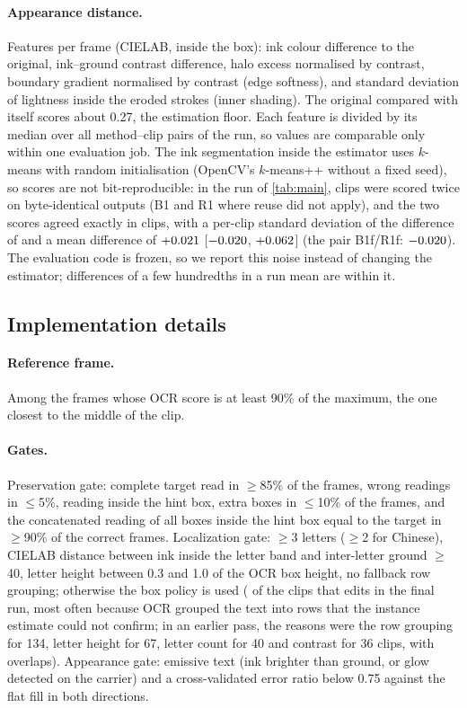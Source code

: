 \paragraph{Appearance distance.} Features per frame (CIELAB, inside the box): ink colour difference to the original, ink--ground contrast difference, halo excess normalised by contrast, boundary gradient normalised by contrast (edge softness), and standard deviation of lightness inside the eroded strokes (inner shading). The original compared with itself scores about 0.27, the estimation floor. Each feature is divided by its median over all method--clip pairs of the run, so values are comparable only within one evaluation job. The ink segmentation inside the estimator uses $k$-means with random initialisation (OpenCV's $k$-means++ without a fixed seed), so scores are not bit-reproducible: in the run of \cref{tab:main}, \rRetestN{} clips were scored twice on byte-identical outputs (B1 and R1 where reuse did not apply), and the two scores agreed exactly in \rRetestSame{} clips, with a per-clip standard deviation of the difference of \rRetestSD{} and a mean difference of $+0.021$ [$-0.020$, $+0.062$] (the pair B1f/R1f: $-0.020$). The evaluation code is frozen, so we report this noise instead of changing the estimator; differences of a few hundredths in a run mean are within it.

\subsection{Implementation details}
\label{sec:supp_impl}

\paragraph{Reference frame.} Among the frames whose OCR score is at least 90\% of the maximum, the one closest to the middle of the clip.

\paragraph{Gates.} Preservation gate: complete target read in $\geq$85\% of the frames, wrong readings in $\leq$5\%, reading inside the hint box, extra boxes in $\leq$10\% of the frames, and the concatenated reading of all boxes inside the hint box equal to the target in $\geq$90\% of the correct frames. Localization gate: $\geq$3 letters ($\geq$2 for Chinese), CIELAB distance between ink inside the letter band and inter-letter ground $\geq$40, letter height between 0.3 and 1.0 of the OCR box height, no fallback row grouping; otherwise the box policy is used (\rBoxPolicy{} of the \rOursCollatN{} clips that \method edits in the final run, most often because OCR grouped the text into rows that the instance estimate could not confirm; in an earlier pass, the reasons were the row grouping for 134, letter height for 67, letter count for 40 and contrast for 36 clips, with overlaps). Appearance gate: emissive text (ink brighter than ground, or glow detected on the carrier) and a cross-validated error ratio below 0.75 against the flat fill in both directions.


